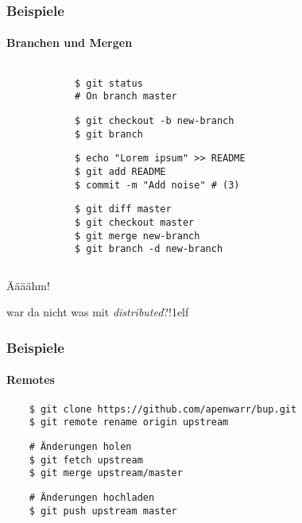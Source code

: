 \documentclass[]{beamer}
\begin{document}
\begin{frame}[fragile]
	\frametitle{Beispiele}
	\framesubtitle{Branchen und Mergen}
	\begin{columns}[T]
		\begin{column}{7.5cm}
			\begin{verbatim}
			$ git status
			# On branch master
			\end{verbatim}

			\begin{verbatim}
			$ git checkout -b new-branch
			$ git branch
			\end{verbatim}

			\begin{verbatim}
			$ echo "Lorem ipsum" >> README
			$ git add README
			$ commit -m "Add noise" # (3)
			\end{verbatim}

			\begin{verbatim}
			$ git diff master
			$ git checkout master
			$ git merge new-branch
			$ git branch -d new-branch
			\end{verbatim}
		\end{column}
		\begin{column}{2.5cm}
		\end{column}
	\end{columns}
\end{frame}

\begin{frame}
	\fontsize{30}{10}\selectfont Äääähm!
	\vspace*{0.5cm}

	\fontsize{20}{10}\selectfont war da nicht was mit \emph{distributed}?!1elf
\end{frame}

\begin{frame}[fragile]
	\frametitle{Beispiele}
	\framesubtitle{Remotes}
	\begin{verbatim}
	$ git clone https://github.com/apenwarr/bup.git
	$ git remote rename origin upstream
	\end{verbatim}

	\begin{verbatim}
	# Änderungen holen
	$ git fetch upstream
	$ git merge upstream/master
	\end{verbatim}

	\begin{verbatim}
	# Änderungen hochladen
	$ git push upstream master
	\end{verbatim}
\end{frame}
\end{document}
